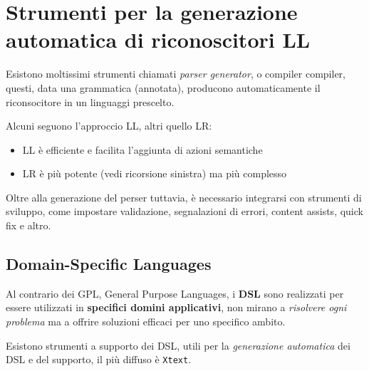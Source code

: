 \chapter{Strumenti per la generazione automatica di riconoscitori LL}

Esistono moltissimi strumenti chiamati \textit{parser generator}, o compiler compiler, questi, data una grammatica (annotata), producono automaticamente il riconsocitore in un linguaggi prescelto.

Alcuni seguono l'approccio LL, altri quello LR:
\begin{itemize}
    \item LL è efficiente e facilita l'aggiunta di azioni semantiche
    \item LR è più potente (vedi ricorsione sinistra) ma più complesso
\end{itemize}

Oltre alla generazione del perser tuttavia, è necessario integrarsi con strumenti di sviluppo, come impostare validazione, segnalazioni di errori, content assists, quick fix e altro.

\section{Domain-Specific Languages}
Al contrario dei GPL, General Purpose Languages, i \textbf{DSL} sono realizzati per essere utilizzati in \textbf{specifici domini applicativi}, non mirano a \textit{risolvere ogni problema} ma a offrire soluzioni efficaci per uno specifico ambito.

Esistono strumenti a supporto dei DSL, utili per la \textit{generazione automatica} dei DSL e del supporto, il più diffuso è \texttt{Xtext}.






















